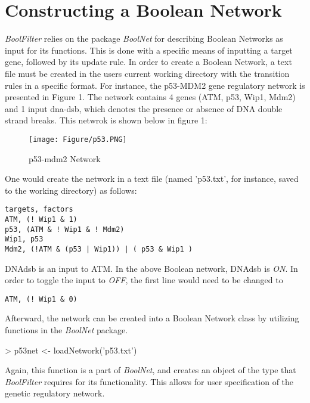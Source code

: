 \documentclass[a4paper]{article}
\theoremstyle{plain}
\theoremstyle{definition}
\theoremstyle{remark}
\begin{document}
\section{Constructing a Boolean Network}
\textit{BoolFilter} relies on the package \textit{BoolNet} for describing Boolean Networks as input for its functions. This is done with a specific means of inputting a target gene, followed by its update rule\cite{mussel2015boolnet}. In order to create a Boolean Network, a text file must be created in the users current working directory with the transition rules in a specific format. For instance, the p53-MDM2 gene regulatory network is presented in Figure 1. The network contains 4 genes (ATM, p53, Wip1, Mdm2) and 1 input dna-dsb, which denotes the presence or absence of DNA double strand breaks.  This netwrok is shown below in figure 1:
\pagebreak
\begin{figure}[h]
\hfill
\begin{center}
\begin{minipage}{0.35\textwidth}
\texttt{[image: Figure/p53.PNG]}
\caption{p53-mdm2 Network}
\label{p53-mdm2 Network}
\end{minipage}
\end{center}
\end{figure}

One would create the network in a text file (named 'p53.txt', for instance, saved to the working directory) as follows:
\begin{verbatim}
targets, factors
ATM, (! Wip1 & 1)
p53, (ATM & ! Wip1 & ! Mdm2)
Wip1, p53
Mdm2, (!ATM & (p53 | Wip1)) | ( p53 & Wip1 )
\end{verbatim}

DNA\textunderscore dsb is an input to ATM. In the above Boolean network, DNA\textunderscore dsb is \textit{ON}. In order to toggle the input to \textit{OFF}, the first line would need to be changed to 

\begin{verbatim}
ATM, (! Wip1 & 0)
\end{verbatim}

Afterward, the network can be created into a Boolean Network class by utilizing functions in the \textit{BoolNet} package.
\begin{Schunk}
\begin{Sinput}
> p53net <- loadNetwork('p53.txt')
\end{Sinput}
\end{Schunk}
Again, this function is a part of \textit{BoolNet}, and creates an object of the type that \textit{BoolFilter} requires for its functionality. This allows for user specification of the genetic regulatory network. 
\end{document}
